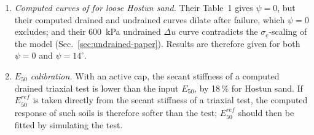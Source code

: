 \documentclass[11pt,a4paper]{article}
\newcommand{\eref}{^{\mathit{ref}}}
\begin{document}
\begin{enumerate}
  \item \emph{Computed curves of \citet{Schanz_1999} for loose Hostun sand.} Their Table~1 gives
        $\psi = 0$, but their computed drained and undrained curves dilate after failure, which
        $\psi = 0$ excludes; and their 600~kPa undrained $\Delta u$ curve contradicts the
        $\sigma_c$-scaling of the model (Sec.~\ref{sec:undrained-paper}). Results are therefore given
        for both $\psi = 0$ and $\psi = 14^\circ$.
  \item \emph{$E_{50}$ calibration.} With an active cap, the secant stiffness of a computed drained
        triaxial test is lower than the input $E_{50}$, by 18\,\% for Hostun sand. If
        $E_{50}\eref$ is taken directly from the secant stiffness of a triaxial test, the computed
        response of such soils is therefore softer than the test; $E_{50}\eref$ should then be
        fitted by simulating the test.
\end{enumerate}



\end{document}
